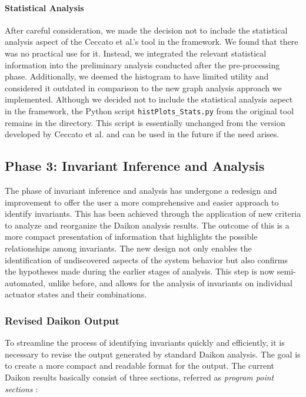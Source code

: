 \paragraph{Statistical Analysis} After careful consideration, we made the decision not to include the statistical analysis aspect of the Ceccato et al.'s tool in the framework. We found that there was no practical use for it. Instead, we integrated the relevant statistical information into the preliminary analysis conducted after the pre-processing phase. Additionally, we deemed the histogram to have limited utility and considered it outdated in comparison to the new graph analysis approach we implemented. \newline
Although we decided not to include the statistical analysis aspect in the framework, the Python script \texttt{histPlots\_Stats.py} from the original tool remains in the directory. This script is essentially unchanged from the version developed by Ceccato et al. and can be used in the future if the need arises. 

\subsection{Phase 3: Invariant Inference and Analysis}
\label{subsec:4_improve_invariants}
The phase of invariant inference and analysis has undergone a redesign and improvement to offer the user a more comprehensive and easier approach to identify invariants. This has been achieved through the application of new criteria to analyze and reorganize the Daikon analysis results. The outcome of this is a more compact presentation of information that highlights the possible relationships among invariants.\newline
The new design not only enables the identification of undiscovered aspects of the system behavior but also confirms the hypotheses made during the earlier stages of analysis. This step is now semi-automated, unlike before, and allows for the analysis of invariants on individual actuator states and their combinations.

\subsubsection{Revised Daikon Output}
\label{subsub:4_new_daikon_output}
To streamline the process of identifying invariants quickly and efficiently, it is necessary to revise the output generated by standard Daikon analysis. The goal is to create a more compact and readable format for the output.
\newline \newline
The current Daikon results basically consist of three sections, referred as \textit{program point sections} \cite{daikon_program_point}:

